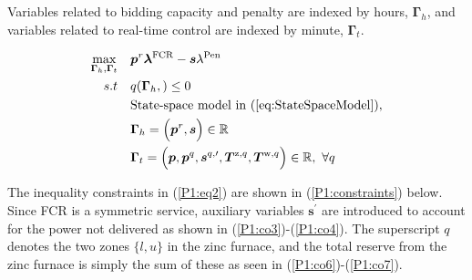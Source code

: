 \documentclass[sigconf]{acmart}
\begin{document}
Variables related to bidding capacity and penalty are indexed by hours, $\bm{\Gamma}_{h}$, and variables related to real-time control are indexed by minute, $\bm{\Gamma}_{t}$.

\begin{subequations}\label{P1:compact_model_fcr}
    \begin{align}
        \underset{\bm{\Gamma}_{h},\bm{\Gamma}_{t}}{\textrm{max}} \quad & \bm{p}^{r} \bm{\lambda}^{\text{FCR}} - \bm{s}\lambda^{\text{Pen}} \label{P1:eq1}
        \\
        s.t \quad                                                      & q(\bm{\Gamma}_{h}, ) \leq 0 \label{P1:eq2}                                                                                                                    \\
        \quad                                                          & \text{State-space model in } (\ref{eq:StateSpaceModel}), \label{P1:eq8}                                                                                       \\
        \quad
                                                                       & \bm{\Gamma}_{h} = \Bigl( \bm{p}^{r}, \bm{s} \Bigr) \in \mathbb{R}  \label{P1:eq9}                                                                             \\
        \quad
                                                                       & \bm{\Gamma}_{t} = \Bigl( \bm{p}, \bm{p}^{q}, \bm{s}^{q, \prime}, \bm{T}^{\text{z},q}, \bm{T}^{\text{w},q} \Bigr) \in \mathbb{R}, \ \forall{q} \label{P1:eq10}
    \end{align}
\end{subequations}

The inequality constraints in (\ref{P1:eq2}) are shown in (\ref{P1:constraints}) below. Since FCR is a symmetric service, auxiliary variables $\bm{s}^{\prime}$ are introduced to account for the power not delivered as shown in (\ref{P1:co3})-(\ref{P1:co4}). The superscript $q$ denotes the two zones $\{l, u\}$ in the zinc furnace, and the total reserve from the zinc furnace is simply the sum of these as seen in (\ref{P1:co6})-(\ref{P1:co7}).
\end{document}
